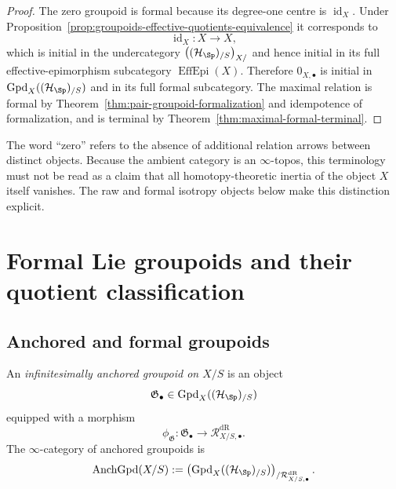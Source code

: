 \begin{proof}
The zero groupoid is formal because its degree-one centre is
$\operatorname{id}_X$.  Under
Proposition~\ref{prop:groupoids-effective-quotients-equivalence} it
corresponds to
\[
    \operatorname{id}_X:X\longrightarrow X,
\]
which is initial in the undercategory $\bigl((\mathcal H_{\Sp})_{/S}\bigr)_{X/}$ and hence initial in
its full effective-epimorphism subcategory $\operatorname{EffEpi}(X)$.  Therefore
$0_{X,\bullet}$ is initial in $\operatorname{Gpd}_X((\mathcal H_{\Sp})_{/S})$ and in its
full formal subcategory.  The maximal relation is formal by
Theorem~\ref{thm:pair-groupoid-formalization} and idempotence of formalization,
and is terminal by Theorem~\ref{thm:maximal-formal-terminal}.
\end{proof}

\begin{remark}
The word ``zero'' refers to the absence of additional relation arrows between
distinct objects.  Because the ambient category is an $\infty$-topos, this
terminology must not be read as a claim that all homotopy-theoretic inertia of
the object $X$ itself vanishes.  The raw and formal isotropy objects below
make this distinction explicit.
\end{remark}


\section{Formal Lie groupoids and their quotient classification}
\label{sec:flg-definition-classification}

\subsection{Anchored and formal groupoids}

\begin{definition}
\label{def:infinitesimally-anchored-groupoid}
An \emph{infinitesimally anchored groupoid on $X/S$} is an object
\[
    \mathfrak G_\bullet
    \in
    \operatorname{Gpd}_X((\mathcal H_{\Sp})_{/S})
\]
equipped with a morphism
\[
    \phi_{\mathfrak G}:
    \mathfrak G_\bullet
    \longrightarrow
    \mathcal R^{\mathrm{dR}}_{X/S,\bullet}.
\]
The $\infty$-category of anchored groupoids is
\[
    \operatorname{AnchGpd}(X/S)
    :=
    \left(
        \operatorname{Gpd}_X((\mathcal H_{\Sp})_{/S})
    \right)_{/\mathcal R^{\mathrm{dR}}_{X/S,\bullet}}.
\]
\end{definition}

